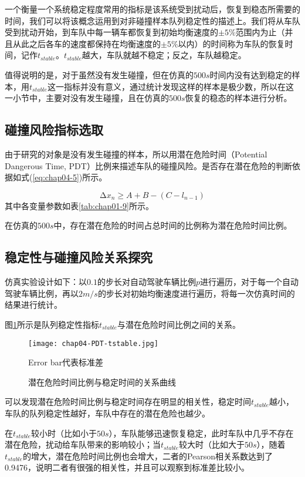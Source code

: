  一个衡量一个系统稳定程度常用的指标是该系统受到扰动后，恢复到稳态所需要的时间，我们可以将该概念运用到对非碰撞样本队列稳定性的描述上。我们将从车队受到扰动开始，到车队中每一辆车都恢复到初始均衡速度的$\pm 5\%$范围内为止（并且从此之后各车的速度都保持在均衡速度的$\pm 5\%$以内）的时间称为车队的恢复时间，记作$t_{stable}$。$t_{stable}$越大，车队就越不稳定；反之，车队越稳定。

 值得说明的是，对于虽然没有发生碰撞，但在仿真的$500s$时间内没有达到稳定的样本，用$t_{stable}$这一指标并没有意义，通过统计发现这样的样本是极少数，所以在这一小节中，主要对没有发生碰撞，且在仿真的$500s$恢复的稳态的样本进行分析。

\subsection{碰撞风险指标选取}

由于研究的对象是没有发生碰撞的样本，所以用潜在危险时间（Potential Dangerous Time, PDT）比例来描述车队的碰撞风险。是否存在潜在危险的判断依据如式(\ref{eq:chap04-5})所示。

\begin{equation}
    \increment{x_n} \geqslant A + B - (C - l_{n-1})
    \label{eq:chap04-5}
\end{equation}
其中各变量参数如表\ref{tab:chap01-9}所示。

在仿真的$500s$中，存在潜在危险的时间占总时间的比例称为潜在危险时间比例。

\subsection{稳定性与碰撞风险关系探究}

仿真实验设计如下：以$0.1$的步长对自动驾驶车辆比例$p$进行遍历，对于每一个自动驾驶车辆比例，再以$2m/s$的步长对初始均衡速度进行遍历，将每一次仿真时间的结果进行统计。

图\ref{fig:chap04-8}所示是队列稳定性指标$t_{stable}$与潜在危险时间比例之间的关系。

\begin{figure}
    \centering
    \texttt{[image: chap04-PDT-tstable.jpg]}
    \caption*{Error bar代表标准差}
    \caption{潜在危险时间比例与稳定时间的关系曲线}
    \label{fig:chap04-8}
\end{figure} 

可以发现潜在危险时间比例与稳定时间存在明显的相关性，稳定时间$t_{stable}$越小，车队的队列稳定性越好，车队中存在的潜在危险也越少。

在$t_{stable}$较小时（比如小于$50s$），车队能够迅速恢复稳定，此时车队中几乎不存在潜在危险，扰动给车队带来的影响较小；当$t_{stable}$较大时（比如大于$50s$），随着$t_{stable}$的增大，潜在危险时间比例也会增大，二者的Pearson相关系数达到了0.9476，说明二者有很强的相关性，并且可以观察到标准差比较小。

